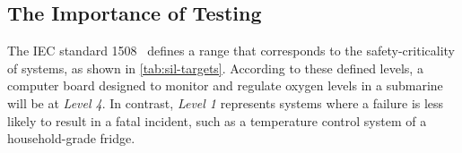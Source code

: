 \subsection{The Importance of Testing}
\label{subsec:importance-testing}

The \ac{IEC} standard 1508~\autocite{SIL1508} defines a range that corresponds
to the safety-criticality of systems, as shown in \autoref{tab:sil-targets}.
According to these defined levels, a computer board designed to monitor and
regulate oxygen levels in a submarine will be at \textit{Level 4}.
In contrast, \textit{Level 1} represents systems where a failure is less likely
to result in a fatal incident, such as a temperature control system of a
household-grade fridge.

\begin{table}[h] %
    \caption[\ac{SIL}]{\ac{SIL} Target failure measures introduced in
    IEC 1508 standard~\autocite{SIL1508}}
    \label{tab:sil-targets}
\end{table}

